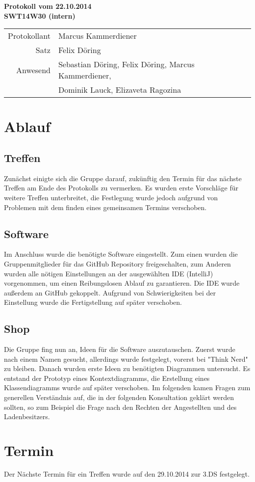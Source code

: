 \documentclass{scrartcl}
\begin{document}
\begin{center}
\LARGE \bf{Protokoll vom 22.10.2014 \\
SWT14W30 (intern)}
\end{center}

\begin{tabular}{rp{10cm}}
Protokollant & Marcus Kammerdiener \\
Satz & Felix Döring \\
Anwesend & Sebastian Döring, Felix Döring, Marcus Kammerdiener,\\
& Dominik Lauck, Elizaveta Ragozina \\
\end{tabular}

\vspace*{3em}

\section{Ablauf}
\subsection{Treffen}
Zunächst einigte sich die Gruppe darauf, zukünftig den Termin für das nächste Treffen am Ende des Protokolls zu vermerken. Es wurden erste Vorschläge für weitere Treffen unterbreitet, die Festlegung wurde jedoch aufgrund von Problemen mit dem finden eines gemeinsamen Termins verschoben.
\subsection{Software}
Im Anschluss wurde die benötigte Software eingestellt. Zum einen wurden die Gruppenmitglieder für das GitHub Repository freigeschalten, zum Anderen wurden alle nötigen Einstellungen an der ausgewählten IDE (IntelliJ) vorgenommen, um einen Reibungslosen Ablauf zu garantieren. Die IDE wurde außerdem an GitHub gekoppelt. Aufgrund von Schwierigkeiten bei der Einstellung wurde die Fertigstellung auf später verschoben.
\subsection{Shop}
Die Gruppe fing nun an, Ideen für die Software auszutauschen. Zuerst wurde nach einem Namen gesucht, allerdings wurde festgelegt, vorerst bei "Think Nerd" zu bleiben. Danach wurden erste Ideen zu benötigten Diagrammen untersucht. Es entstand der Prototyp eines Kontextdiagramms, die Erstellung eines Klassendiagramms wurde auf später verschoben. Im folgenden kamen Fragen zum generellen Verständnis auf, die in der folgenden Konsultation geklärt werden sollten, so zum Beispiel die Frage nach den Rechten der Angestellten und des Ladenbesitzers.
\section{Termin}
Der Nächste Termin für ein Treffen wurde auf den 29.10.2014 zur 3.DS festgelegt.
\end{document}
